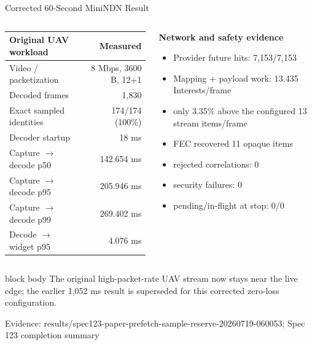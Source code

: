 \documentclass[aspectratio=169]{beamer}
\newcommand{\bluebox}[1]{%
  \begin{beamercolorbox}[rounded=true,shadow=false,sep=0.65em,wd=0.94\linewidth]{block body}
  #1
  \end{beamercolorbox}
}
\newcommand{\evidence}[1]{%
  \vfill\par\noindent
  \begin{minipage}{\linewidth}
  \raggedright{\color{SoftGray}\tiny Evidence: #1}\par
  \end{minipage}
}
\begin{document}
\begin{frame}{Corrected 60-Second MiniNDN Result}
\scriptsize
\begin{columns}[T]
\begin{column}{0.52\textwidth}
\renewcommand{\arraystretch}{1.18}
\begin{tabularx}{\linewidth}{Y r}
\toprule
\textbf{Original UAV workload} & \textbf{Measured} \\
\midrule
Video / packetization & 8 Mbps, 3600 B, 12+1 \\
Decoded frames & 1,830 \\
Exact sampled identities & 174/174 (100\%) \\
Decoder startup & 18 ms \\
Capture $\rightarrow$ decode p50 & 142.654 ms \\
Capture $\rightarrow$ decode p95 & 205.946 ms \\
Capture $\rightarrow$ decode p99 & 269.402 ms \\
Decode $\rightarrow$ widget p95 & 4.076 ms \\
\bottomrule
\end{tabularx}
\end{column}
\begin{column}{0.44\textwidth}
\textbf{Network and safety evidence}
\begin{itemize}
  \item Provider future hits: 7,153/7,153
  \item Mapping + payload work: 13.435 Interests/frame
  \item only 3.35\% above the configured 13 stream items/frame
  \item FEC recovered 11 opaque items
  \item rejected correlations: 0
  \item security failures: 0
  \item pending/in-flight at stop: 0/0
\end{itemize}
\end{column}
\end{columns}

\vspace{0.35em}
\bluebox{The original high-packet-rate UAV stream now stays near the live edge; the earlier 1,052 ms result is superseded for this corrected zero-loss configuration.}
\evidence{results/spec123-paper-prefetch-sample-reserve-20260719-060053; Spec 123 completion summary}
\end{frame}
\end{document}
